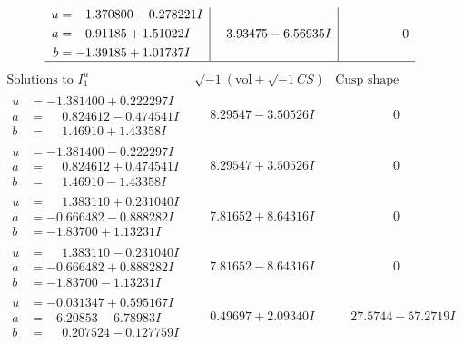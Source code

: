 \documentclass[1p]{elsarticle_modified}
\theoremstyle{definition}
\newcommand{\I}{\sqrt{-1}}
\begin{document}
$$\begin{array}{c|c|c}
\begin{aligned}
u &= \phantom{-}1.370800 - 0.278221 I \\
a &= \phantom{-}0.91185 + 1.51022 I \\
b &= -1.39185 + 1.01737 I\end{aligned}
 & \phantom{-}3.93475 - 6.56935 I & \phantom{-0.000000 } 0\\
 \hline 
 \end{array}$$\newpage$$\begin{array}{c|c|c}  
\text{Solutions to }I^u_{1}& \I (\text{vol} + \sqrt{-1}CS) & \text{Cusp shape}\\
 \hline 
\begin{aligned}
u &= -1.381400 + 0.222297 I \\
a &= \phantom{-}0.824612 - 0.474541 I \\
b &= \phantom{-}1.46910 + 1.43358 I\end{aligned}
 & \phantom{-}8.29547 - 3.50526 I & \phantom{-0.000000 } 0 \\ \hline\begin{aligned}
u &= -1.381400 - 0.222297 I \\
a &= \phantom{-}0.824612 + 0.474541 I \\
b &= \phantom{-}1.46910 - 1.43358 I\end{aligned}
 & \phantom{-}8.29547 + 3.50526 I & \phantom{-0.000000 } 0 \\ \hline\begin{aligned}
u &= \phantom{-}1.383110 + 0.231040 I \\
a &= -0.666482 - 0.888282 I \\
b &= -1.83700 + 1.13231 I\end{aligned}
 & \phantom{-}7.81652 + 8.64316 I & \phantom{-0.000000 } 0 \\ \hline\begin{aligned}
u &= \phantom{-}1.383110 - 0.231040 I \\
a &= -0.666482 + 0.888282 I \\
b &= -1.83700 - 1.13231 I\end{aligned}
 & \phantom{-}7.81652 - 8.64316 I & \phantom{-0.000000 } 0 \\ \hline\begin{aligned}
u &= -0.031347 + 0.595167 I \\
a &= -6.20853 - 6.78983 I \\
b &= \phantom{-}0.207524 - 0.127759 I\end{aligned}
 & \phantom{-}0.49697 + 2.09340 I & \phantom{-}27.5744 + 57.2719 I \\ \hline\begin{aligned}

\end{aligned}
\end{array}$$
\end{document}
